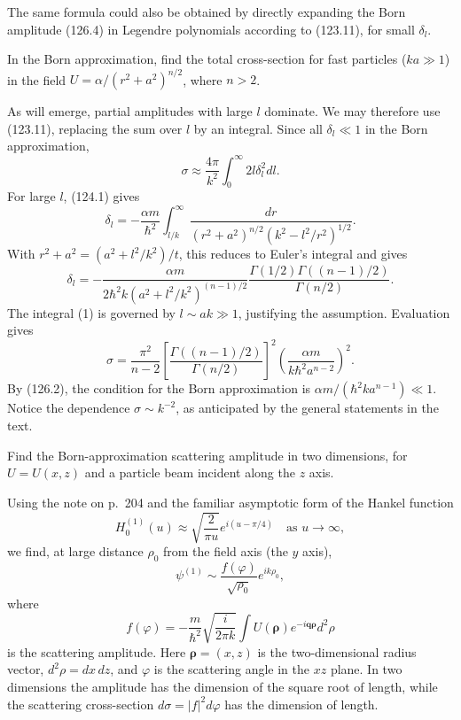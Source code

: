 The same formula could also be obtained by directly expanding the Born
amplitude (126.4) in Legendre polynomials according to (123.11), for small
$\delta_l$.

 In the Born approximation, find the total cross-section
for fast particles ($ka\gg1$) in the field
$U=\alpha/(r^2+a^2)^{n/2}$, where $n>2$.

\SolutionHeading As will emerge, partial amplitudes with large $l$ dominate.
We may therefore use (123.11), replacing the sum over $l$ by an integral. Since
all $\delta_l\ll1$ in the Born approximation,
\begin{equation}
 \sigma\approx\frac{4\pi}{k^2}\int_0^\infty2l\delta_l^2dl.
 \tag{1}
\end{equation}
For large $l$, (124.1) gives
\[
 \delta_l=-\frac{\alpha m}{\hbar^2}\int_{l/k}^\infty
 \frac{dr}{(r^2+a^2)^{n/2}(k^2-l^2/r^2)^{1/2}}.
\]
With $r^2+a^2=(a^2+l^2/k^2)/t$, this reduces to Euler's integral and gives
\begin{equation}
 \delta_l=-\frac{\alpha m}{2\hbar^2k(a^2+l^2/k^2)^{(n-1)/2}}
 \frac{\Gamma(1/2)\Gamma((n-1)/2)}{\Gamma(n/2)}.
 \tag{2}
\end{equation}
The integral (1) is governed by $l\sim ak\gg1$, justifying the assumption.
Evaluation gives
\begin{equation}
 \sigma=\frac{\pi^2}{n-2}
 \left[\frac{\Gamma((n-1)/2)}{\Gamma(n/2)}\right]^2
 \left(\frac{\alpha m}{k\hbar^2a^{n-2}}\right)^2.
 \tag{3}
\end{equation}
By (126.2), the condition for the Born approximation is
$\alpha m/(\hbar^2ka^{n-1})\ll1$. Notice the dependence
$\sigma\sim k^{-2}$, as anticipated by the general statements in the text.

 Find the Born-approximation scattering amplitude in two
dimensions, for $U=U(x,z)$ and a particle beam incident along the $z$ axis.

\SolutionHeading Using the note on p.~204 and the familiar asymptotic form of
the Hankel function
\begin{equation}
 H_0^{(1)}(u)\approx\sqrt{\frac2{\pi u}}e^{i(u-\pi/4)}
 \quad\text{as }u\to\infty,
 \tag{4}
\end{equation}
we find, at large distance $\rho_0$ from the field axis (the $y$ axis),
\[
 \psi^{(1)}\sim\frac{f(\varphi)}{\sqrt{\rho_0}}e^{ik\rho_0},
\]
where
\[
 f(\varphi)=-\frac{m}{\hbar^2}\sqrt{\frac{i}{2\pi k}}
 \int U(\boldsymbol\rho)e^{-i\mathbf q\boldsymbol\rho}d^2\rho
\]
is the scattering amplitude. Here $\boldsymbol\rho=(x,z)$ is the
two-dimensional radius vector, $d^2\rho=dx\,dz$, and $\varphi$ is the
scattering angle in the $xz$ plane. In two dimensions the amplitude has the
dimension of the square root of length, while the scattering cross-section
$d\sigma=|f|^2d\varphi$ has the dimension of length.
